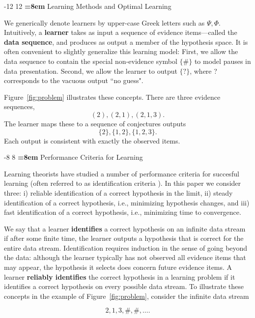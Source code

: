 \documentclass{elsarticle}%
\makeatletter
\renewcommand\section{\@startsection {section}{1}{\z@}%
  {-12\p@ \@plus -4\p@ \@minus -4\p@}%
                       {12\p@ \@plus 4\p@ \@minus 4\p@}%
                                   {\normalfont\large\bfseries\boldmath
                                   \rightskip=\z@ \@plus 8em\pretolerance=10000 }}
\renewcommand\subsection{\@startsection {subsection}{1}{\z@}%
  {-8\p@ \@plus -4\p@ \@minus -4\p@}%
                       {8\p@ \@plus 4\p@ \@minus 4\p@}%
                                   {\normalfont\large\bfseries\boldmath
                                   \rightskip=\z@ \@plus 8em\pretolerance=10000 }}
\newcommand{\learnera}{\Psi}
\newcommand{\learnerb}{\Phi}
\makeatother
\begin{document}
\section{Learning Methods and Optimal Learning}

We generically denote learners by upper-case Greek letters such as $\learnera, \learnerb$.
Intuitively, a \textbf{learner} takes as input a sequence of evidence items---called the \textbf{data sequence}, and produces as output a member of the hypothesis space. 
It is often convenient to slightly generalize this learning model: First, we allow the data sequence to contain the special non-evidence symbol $\{\#\}$ to model pauses in
data presentation. Second, we allow the learner to output $\{?\}$, where ? corresponds to the vacuous output ``no guess".  

Figure~\ref{fig:problem} illustrates these concepts. There are three evidence sequences, 
$$(2), (2,1), (2,1,3).$$ The learner maps these to a sequence of conjectures outputs $$\{2\},\{1,2\},\{1,2,3\}.$$ Each output is consistent with exactly the observed items. 


\subsection{Performance Criteria for Learning}

Learning theorists have studied a number  of performance criteria for succesful learning (often referred to as identification criteria \cite{Case.Smith:83}). In this paper we consider three: i) reliable identification of a correct hypothesis in the limit, ii) steady identification of a correct hypothesis, i.e., minimizing hypothesis changes, and iii) fast identification of a correct hypothesis, i.e., minimizing time to convergence. 

We say that a learner \textbf{identifies} a correct hypothesis on an infinite data stream if after some finite time, the learner outputs a hypothesis that is correct for the entire data stream. Identification requires induction in the sense of going beyond the data: although the learner typically has not observed all evidence items that may appear, the hypothesis it selects does concern future evidence items. A learner \textbf{reliably identifies} the correct hypothesis in a learning problem if it identifies a correct hypothesis on every possible data stream. To illustrate these concepts in the example of Figure~\ref{fig:problem}, consider the infinite data stream

$$2,1,3,\#,\#,\ldots.$$
\end{document}

